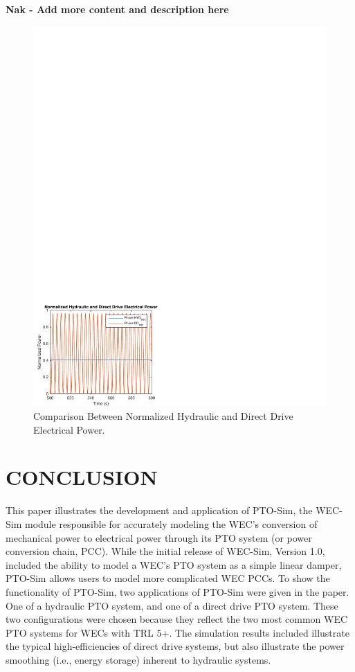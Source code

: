 \documentclass[twocolumn,10pt]{asme2e}
\begin{document}
\textbf{Nak - Add more content and description here}

\begin{figure}[t]
    \centering
    \includegraphics[width=1\columnwidth]{Images/HDYnDDelecPower}
    \caption{Comparison Between Normalized Hydraulic and Direct Drive Electrical Power.}
    \label{Pnorm}
    \end{figure}


\section*{CONCLUSION}

This paper illustrates the development and application of PTO-Sim, the WEC-Sim module responsible for accurately modeling the WEC's conversion of mechanical power to electrical power through its PTO system (or power conversion chain, PCC). While the initial release of WEC-Sim, Version 1.0, included the ability to model a WEC's PTO system as a simple linear damper, PTO-Sim allows users to model more complicated WEC PCCs. To show the functionality of PTO-Sim, two applications of PTO-Sim were given in the paper. One of a hydraulic PTO system, and one of a direct drive PTO system. These two configurations were chosen because they reflect the two most common WEC PTO systems for WECs with TRL 5+.  The simulation results included illustrate the typical high-efficiencies of direct drive systems, but also illustrate the power smoothing (i.e., energy storage) inherent to hydraulic systems. 
\end{document}
